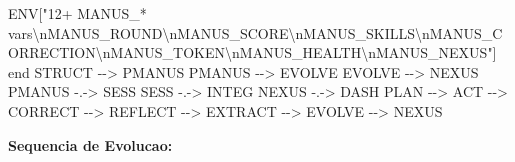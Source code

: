 \documentclass[
  12pt,
]{article}
\newenvironment{Shaded}{}{}
\newcommand{\NormalTok}[1]{#1}
\begin{document}
\begin{Shaded}
\begin{Highlighting}[]
\NormalTok{ENV["12+ MANUS\_* vars\textbackslash{}nMANUS\_ROUND\textbackslash{}nMANUS\_SCORE\textbackslash{}nMANUS\_SKILLS\textbackslash{}nMANUS\_CORRECTION\textbackslash{}nMANUS\_TOKEN\textbackslash{}nMANUS\_HEALTH\textbackslash{}nMANUS\_NEXUS"]}
\NormalTok{end}
\NormalTok{STRUCT {-}{-}\textgreater{} PMANUS}
\NormalTok{PMANUS {-}{-}\textgreater{} EVOLVE}
\NormalTok{EVOLVE {-}{-}\textgreater{} NEXUS}
\NormalTok{PMANUS {-}.{-}\textgreater{} SESS}
\NormalTok{SESS {-}.{-}\textgreater{} INTEG}
\NormalTok{NEXUS {-}.{-}\textgreater{} DASH}
\NormalTok{PLAN {-}{-}\textgreater{} ACT {-}{-}\textgreater{} CORRECT {-}{-}\textgreater{} REFLECT {-}{-}\textgreater{} EXTRACT {-}{-}\textgreater{} EVOLVE {-}{-}\textgreater{} NEXUS}
\end{Highlighting}
\end{Shaded}

\textbf{Sequencia de Evolucao:}
\end{document}
